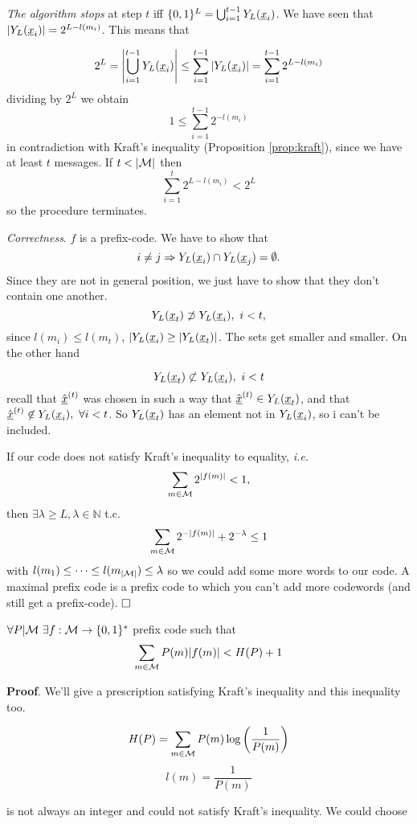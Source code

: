 \noindent\emph{The algorithm stops} at step $t$ iff $\{0, 1\}^L = \bigcup_{i = 1}^{t-1}Y_L(\underline{x}_i)$. We have seen that $|Y_L(\underline{x}_i)| = 2^{L - l(m_i)}$. This means that

\[
2^L = \left|\bigcup_{i=1}^{t-1}Y_L(\underline{x}_i) \right| \leq \sum_{i=1}^{t-1}|Y_L(\underline{x}_i)| = \sum_{i=1}^{t-1} 2^{L-l(m_i)}
\]
dividing by $2^L$ we obtain
$$1 \leq \sum_{i=1}^{t-1}2^{-l(m_i)}$$
in contradiction with Kraft's inequality (Proposition \ref{prop:kraft}), since we have at least $t$ messages. If $t < |\mathcal{M}|$ then $$\sum_{i=1}^{t} 2^{L-l(m_i)} < 2^L$$ so the procedure terminates.

\noindent\emph{Correctness}. $f$ is a prefix-code. We have to show that $$i \not= j \Rightarrow Y_L(\underline{x}_i) \cap Y_L(\underline{x}_j) = \emptyset.$$
Since they are not in general position, we just have to show that they don't contain one another. $$Y_L(\underline{x}_t) \not\supset Y_L(\underline{x}_i),\ i < t,$$ since $l(m_i) \leq l(m_t)$, $|Y_L(\underline{x}_i) \geq |Y_L(\underline{x}_t)|$. The sets get smaller and smaller. On the other hand

$$Y_L(\underline{x}_t) \not\subset Y_L(\underline{x}_i),\ i < t$$
recall that $\hat{\underline{x}}^{(t)}$ was chosen in such a way that $\hat{\underline{x}}^{(t)} \in Y_L(\underline{x}_t)$, and that $\hat{\str{x}}^{(t)} \not\in \prol{\str{x}_i},\ \forall i < t$. So $Y_L(\underline{x}_t)$ has an element not in $Y_L(\underline{x}_i)$, so i can't be included.

If our code does not satisfy Kraft's inequality to equality, \emph{i.e.} $$\sum_{m\in\mathcal{M}}2^{|f(m)|} < 1,$$ then $\exists \lambda \geq L, \lambda \in \mathbb{N}$ t.c. $$\sum_{m\in\mathcal{M}}2^{-|f(m)|} + 2^{-\lambda} \leq 1$$ with $l(m_1) \leq \cdots \leq l(m_{|\mathcal{M}|}) \leq \lambda$ so we could add some more words to our code. A maximal prefix code is a prefix code to which you can't add more codewords (and still get a prefix-code).
$\hfill\Box$

\begin{prop}
 $\forall P|\mathcal{M}\ \exists f:\mathcal{M} \rightarrow \{0, 1\}^*$ prefix code such that
 \[
  \sum_{m\in \mathcal{M}} P(m)|f(m)| < H(P) + 1
 \]
\end{prop}

\noindent\textbf{Proof}. We'll give a prescription satisfying Kraft's inequality and this inequality too. 

\[
 H(P) = \sum_{m \in \mathcal{M}} P(m)\log\left(\dfrac{1}{P(m)}\right)
\]
\[
l(m) = \dfrac{1}{P(m)}
\]

is not always an integer and could not satisfy Kraft's inequality. We could choose

